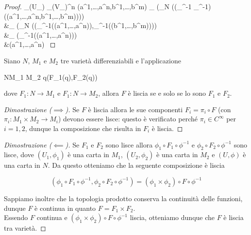 \begin{proof}
	{\phi_{\alpha}(U_{\alpha}) \times \psi_{\beta}(V_{\beta})}{\R^{n}}
	{(a^{1},\dots,a^{n},b^{1},\dots,b^{m})}{%
		\phi_{\alpha} (\pi_{N} ((\phi_{\alpha}^{-1} \times \psi_{\beta}^{-1}) ((a^{1},\dots,a^{n},b^{1},\dots,b^{m}))))\\
		&\mapsto \phi_{\alpha} (\pi_{N} ((\phi_{\alpha}^{-1}((a^{1},\dots,a^{n})),\psi_{\beta}^{-1}((b^{1},\dots,b^{m}))))\\
		&\mapsto \phi_{\alpha} (\phi_{\alpha}^{-1}((a^{1},\dots,a^{n})))\\
		&\mapsto (a^{1},\dots,a^{n})
	}
\end{proof}

\begin{remark}
	Siano $ N $, $ M_{1} $ e $ M_{2} $ tre varietà differenziabili e l'applicazione
	
		{N}{M_{1} \times M_{2}}
		{q}{(F_{1}(q),F_{2}(q))}
	
	dove $ F_{1} : N \to M_{1} $ e $ F_{1} : N \to M_{2} $, allora $ F $ è liscia se e solo se lo sono $ F_{1} $ e $ F_{2} $.
\end{remark}

\begin{proof}[Dimostrazione ($ \implies $)]
	Se $ F $ è liscia allora le sue componenti $ F_{i} = \pi_{i} \circ F $ (con $ \pi_{i} : M_{1} \times M_{2} \to M_{i} $) devono essere lisce: questo è verificato perché $ \pi_{i} \in C^{\infty} $ per $ i=1,2 $, dunque la composizione che risulta in $ F_{i} $ è liscia.
\end{proof}

\begin{proof}[Dimostrazione ($ \impliedby $)]
	Se $ F_{1} $ e $ F_{2} $ sono lisce allora $ \phi_{1} \circ F_{1} \circ \phi^{-1} $ e $ \phi_{2} \circ F_{2} \circ \phi^{-1} $ sono lisce, dove $ (U_{1},\phi_{1}) $ è una carta in $ M_{1} $, $ (U_{2},\phi_{2}) $ è una carta in $ M_{2} $ e $ (U,\phi) $ è una carta in $ N $. Da questo otteniamo che la seguente composizione è liscia
	
	\begin{equation}
		(\phi_{1} \circ F_{1} \circ \phi^{-1}, \phi_{2} \circ F_{2} \circ \phi^{-1}) = (\phi_{1} \times \phi_{2}) \circ F \circ \phi^{-1}
	\end{equation}
	
	Sappiamo inoltre che la topologia prodotto conserva la continuità delle funzioni, dunque $ F $ è continua in quanto $ F = F_{1} \times F_{2} $.\\
	Essendo $ F $ continua e $ (\phi_{1} \times \phi_{2}) \circ F \circ \phi^{-1} $ liscia, otteniamo dunque che $ F $ è liscia tra varietà.
\end{proof}

